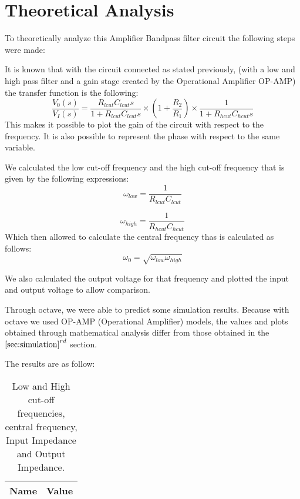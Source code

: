 
\section{Theoretical Analysis}
\label{sec:analysis}

To theoretically analyze this Amplifier Bandpass filter circuit the following steps were made:
\par
\par
It is known that with the circuit connected as stated previously, (with a low and high pass filter and a gain stage created by the Operational Amplifier OP-AMP) the transfer function is the following:
\begin{equation}
    \dfrac{V_0(s)}{V_I(s)} = \dfrac{R_{lcut} C_{lcut} s}{1+R_{lcut} C_{lcut} s}\times \left( 1+\dfrac{R_2}{R_1} \right) \times \dfrac{1}{1+R_{hcut} C_{hcut} s}
\end{equation}
This makes it possible to plot the gain of the circuit with respect to the frequency. It is also possible to represent the phase with respect to the same variable.
\par
\par

We calculated the low cut-off frequency and the high cut-off frequency that is given by the following expressions:
\begin{equation}
    \omega_{low} = \dfrac{1}{R_{lcut} C_{lcut}}
\end{equation}

\begin{equation}
    \omega_{high} = \dfrac{1}{R_{hcut} C_{hcut}}
\end{equation}
Which then allowed to calculate the central frequency thas is calculated as follows:
\begin{equation}
    \omega_{0} = \sqrt{\omega_{low} \omega_{high}}
\end{equation}

We also calculated the output voltage for that frequency and plotted the input and output voltage to allow comparison.

Through octave, we were able to predict some simulation results. Because with octave we used OP-AMP (Operational Amplifier)  models, the values and plots obtained through mathematical analysis differ from those obtained in the $\ref{sec:simulation}^{rd}$ section.

The results are as follow:

\begin{table}[H]
\centering
\begin{tabular}{|l|l|}
\hline
{\bf Name} & {\bf Value} \\ \hline
    
\end{tabular}
\caption{Low and High cut-off frequencies, central frequency, Input Impedance and Output Impedance.}
\end{table}

